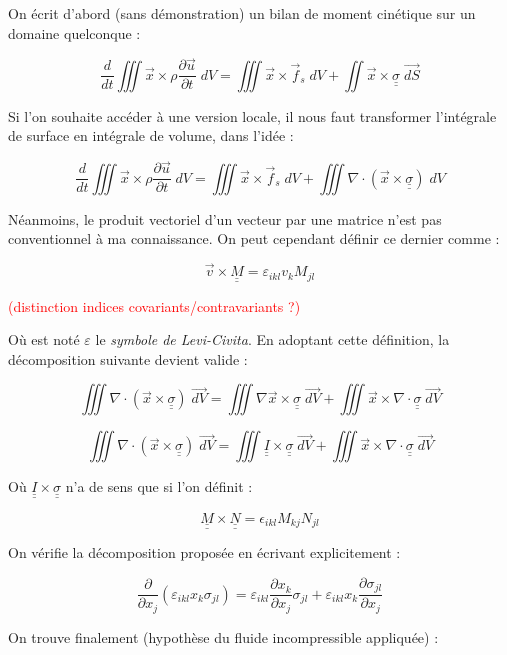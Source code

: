 \documentclass{article}
\begin{document}
On écrit d'abord (sans démonstration) un bilan de moment cinétique sur un domaine quelconque :

\[
\frac{d}{dt}\iiint\vec{x}\times\rho\frac{\partial \vec{u}}{\partial t}\; dV=\iiint\vec{x}\times\vec{f}_s \; dV+\iint\vec{x}\times\underline{\underline{\sigma}}\; \vec{dS}
\]

Si l'on souhaite accéder à une version locale, il nous faut transformer l'intégrale de surface en intégrale de volume, dans l'idée :

\[
\frac{d}{dt}\iiint\vec{x}\times\rho\frac{\partial \vec{u}}{\partial t}\; dV=\iiint\vec{x}\times\vec{f}_s \; dV+\iiint\nabla\cdot(\vec{x}\times\underline{\underline{\sigma}})\; dV
\]

Néanmoins, le produit vectoriel d'un vecteur par une matrice n'est pas conventionnel à ma connaissance. On peut cependant définir ce dernier comme :

\[
\vec{v}\times \underline{\underline{M}} = \varepsilon_{ikl}v_kM_{jl}
\]

\textcolor{red}{(distinction indices covariants/contravariants ?)}

Où est noté $\varepsilon$ le \emph{symbole de Levi-Civita}. En adoptant cette définition, la décomposition suivante devient valide :

\[
\iiint\nabla\cdot(\vec{x}\times\underline{\underline{\sigma}})\; \vec{dV} = \iiint\nabla\vec{x}\times\underline{\underline{\sigma}}\; \vec{dV}+\iiint\vec{x}\times\nabla\cdot\underline{\underline{\sigma}}\; \vec{dV}
\]

\[
\iiint\nabla\cdot(\vec{x}\times\underline{\underline{\sigma}})\; \vec{dV} = \iiint\underline{\underline{I}}\times\underline{\underline{\sigma}}\; \vec{dV}+\iiint\vec{x}\times\nabla\cdot\underline{\underline{\sigma}}\; \vec{dV}
\]

Où $\underline{\underline{I}}\times\underline{\underline{\sigma}}$ n'a de sens que si l'on définit :

\[
\underline{\underline{M}}\times\underline{\underline{N}}=\epsilon_{ikl}M_{kj}N_{jl}
\]

On vérifie la décomposition proposée en écrivant explicitement :

\[
\frac{\partial}{\partial x_j}(\varepsilon_{ikl}x_k\sigma_{jl}) = \varepsilon_{ikl}\frac{\partial x_k}{\partial x_j}\sigma_{jl}+ \varepsilon_{ikl}x_k\frac{\partial\sigma_{jl}}{\partial x_j}
\]

On trouve finalement (hypothèse du fluide incompressible appliquée) :
\end{document}
